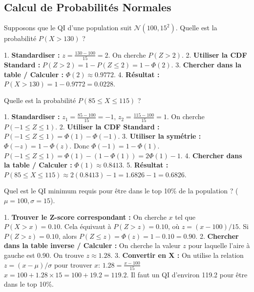 \subsection{Calcul de Probabilités Normales}

\begin{examplebox}
Supposons que le QI d'une population suit $\mathcal{N}(100, 15^2)$. Quelle est la probabilité $P(X > 130)$ ?

1.  \textbf{Standardiser :} $z = \frac{130 - 100}{15} = 2$. On cherche $P(Z > 2)$.
2.  \textbf{Utiliser la CDF Standard :} $P(Z > 2) = 1 - P(Z \le 2) = 1 - \Phi(2)$.
3.  \textbf{Chercher dans la table / Calculer :} $\Phi(2) \approx 0.9772$.
4.  \textbf{Résultat :} $P(X > 130) = 1 - 0.9772 = 0.0228$.
\end{examplebox}

\begin{examplebox}
Quelle est la probabilité $P(85 \le X \le 115)$ ?

1.  \textbf{Standardiser :} $z_1 = \frac{85 - 100}{15} = -1$, $z_2 = \frac{115 - 100}{15} = 1$. On cherche $P(-1 \le Z \le 1)$.
2.  \textbf{Utiliser la CDF Standard :} $P(-1 \le Z \le 1) = \Phi(1) - \Phi(-1)$.
3.  \textbf{Utiliser la symétrie :} $\Phi(-z) = 1 - \Phi(z)$. Donc $\Phi(-1) = 1 - \Phi(1)$.
    $P(-1 \le Z \le 1) = \Phi(1) - (1 - \Phi(1)) = 2\Phi(1) - 1$.
4.  \textbf{Chercher dans la table / Calculer :} $\Phi(1) \approx 0.8413$.
5.  \textbf{Résultat :} $P(85 \le X \le 115) \approx 2(0.8413) - 1 = 1.6826 - 1 = 0.6826$.
\end{examplebox}

\begin{examplebox}
Quel est le QI minimum requis pour être dans le top 10\% de la population ? ($\mu=100, \sigma=15$).

1.  \textbf{Trouver le Z-score correspondant :} On cherche $x$ tel que $P(X > x) = 0.10$. Cela équivaut à $P(Z > z) = 0.10$, où $z = (x-100)/15$.
    Si $P(Z > z) = 0.10$, alors $P(Z \le z) = \Phi(z) = 1 - 0.10 = 0.90$.
2.  \textbf{Chercher dans la table inverse / Calculer :} On cherche la valeur $z$ pour laquelle l'aire à gauche est 0.90. On trouve $z \approx 1.28$.
3.  \textbf{Convertir en X :} On utilise la relation $z = (x-\mu)/\sigma$ pour trouver $x$:
    $1.28 = \frac{x - 100}{15}$
    $x = 100 + 1.28 \times 15 = 100 + 19.2 = 119.2$.
    Il faut un QI d'environ 119.2 pour être dans le top 10\%.
\end{examplebox}
